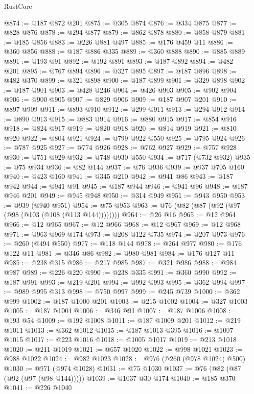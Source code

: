 \begin{lexlean}{RustCore}
\begin{coremodule}
@874 := @187 @872 @201
@875 := @305 @874
@876 := @334 @875
@877 := @828 @876
@878 := @294 @877
@879 := @862 @878
@880 := @858 @879
@881 := @185 @856
@883 := @226 @881 @497
@885 := @176 @459 @11
@886 := @360 @856
@888 := @187 @886 @335
@889 := @360 @888
@890 := @885 @889
@891 := @193 @91
@892 := @192 @891
@893 := @187 @892
@894 := @482 @201
@895 := @767 @894
@896 := @327 @895
@897 := @187 @896
@898 := @482 @370
@899 := @321 @898
@900 := @187 @899
@901 := @329 @898
@902 := @187 @901
@903 := @428 @246
@904 := @426 @903
@905 := @902 @904
@906 := @900 @905
@907 := @829 @906
@909 := @187 @907 @201
@910 := @897 @909
@911 := @893 @910
@912 := @299 @911
@913 := @294 @912
@914 := @890 @913
@915 := @883 @914
@916 := @880 @915
@917 := @854 @916
@918 := @824 @917
@919 := @820 @918
@920 := @814 @919
@921 := @810 @920
@922 := @804 @921
@924 := @799 @922 @550
@925 := @795 @924
@926 := @787 @925
@927 := @774 @926
@928 := @762 @927
@929 := @757 @928
@930 := @751 @929
@932 := @748 @930 @550
@934 := @717 (@732 @932)
@935 := @75 @934
@936 := @82 @144
@937 := @76 @936
@939 := @937 @705 @160
@940 := @423 @160
@941 := @345 @210
@942 := @941 @86
@943 := @187 @942
@944 := @941 @91
@945 := @187 @944
@946 := @941 @96
@948 := @187 @946 @201
@949 := @945 @948
@950 := @314 @949
@951 := @943 @950
@953 := @939 (@940 @951)
@954 := @75 @953
@963 := @76 (@82 (@87 (@92 (@97 (@98 (@103 (@108 (@113 @144))))))))
@964 := @26 @16
@965 := @12 @964
@966 := @12 @965
@967 := @12 @966
@968 := @12 @967
@969 := @12 @968
@971 := @963 @969 @174
@973 := @208 @122 @735
@974 := @207 @973
@976 := @260 (@494 @550)
@977 := @118 @144
@978 := @264 @977
@980 := @176 @122 @11
@981 := @346 @86
@982 := @980 @981
@984 := @176 @127 @11
@985 := @238 @315
@986 := @217 @985
@987 := @321 @986
@988 := @984 @987
@989 := @226 @220
@990 := @238 @335
@991 := @360 @990
@992 := @187 @991
@993 := @219 @201
@994 := @992 @993
@995 := @362 @994
@997 := @989 @995 @313
@998 := @750 @997
@999 := @245 @739
@1000 := @362 @999
@1002 := @187 @1000 @201
@1003 := @215 @1002
@1004 := @327 @1003
@1005 := @187 @1004
@1006 := @346 @91
@1007 := @187 @1006
@1008 := @193 @54
@1009 := @192 @1008
@1011 := @187 @1009 @201
@1012 := @219 @1011
@1013 := @362 @1012
@1015 := @187 @1013 @395
@1016 := @1007 @1015
@1017 := @223 @1016
@1018 := @1005 @1017
@1019 := @213 @1018
@1020 := @211 @1019
@1021 := @657 @1020
@1022 := @998 @1021
@1023 := @988 @1022
@1024 := @982 @1023
@1028 := @976 (@260 (@978 @1024) @500)
@1030 := @971 (@974 @1028)
@1031 := @75 @1030
@1037 := @76 (@82 (@87 (@92 (@97 (@98 @144)))))
@1039 := @1037 @30 @174
@1040 := @185 @370
@1041 := @226 @1040

\end{coremodule}
\end{lexlean}
